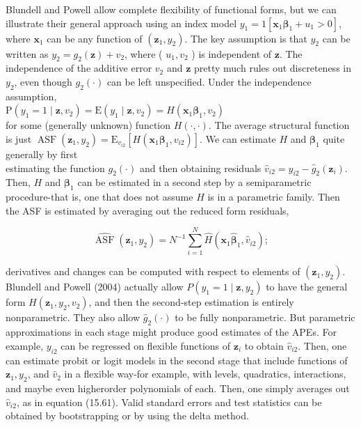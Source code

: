 \documentclass[10pt]{article}
\begin{document}
Blundell and Powell allow complete flexibility of functional forms, but we can illustrate their general approach using an index model $y_{1}=1\left[\mathbf{x}_{1} \boldsymbol{\beta}_{1}+u_{1}>0\right]$, where $\mathbf{x}_{1}$ can be any function of $\left(\mathbf{z}_{1}, y_{2}\right)$. The key assumption is that $y_{2}$ can be written as $y_{2}=g_{2}(\mathbf{z})+v_{2}$, where ( $u_{1}, v_{2}$ ) is independent of $\mathbf{z}$. The independence of the additive error $v_{2}$ and $\mathbf{z}$ pretty much rules out discreteness in $y_{2}$, even though $g_{2}(\cdot)$ can be left unspecified. Under the independence assumption,\\
$\mathrm{P}\left(y_{1}=1 \mid \mathbf{z}, v_{2}\right)=\mathrm{E}\left(y_{1} \mid \mathbf{z}, v_{2}\right)=H\left(\mathbf{x}_{1} \boldsymbol{\beta}_{1}, v_{2}\right)$\\
for some (generally unknown) function $H(\cdot, \cdot)$. The average structural function is just $\operatorname{ASF}\left(\mathbf{z}_{1}, y_{2}\right)=\mathrm{E}_{v_{i 2}}\left[H\left(\mathbf{x}_{1} \boldsymbol{\beta}_{1}, v_{i 2}\right)\right]$. We can estimate $H$ and $\boldsymbol{\beta}_{1}$ quite generally by first\\
estimating the function $g_{2}(\cdot)$ and then obtaining residuals $\hat{v}_{i 2}=y_{i 2}-\hat{g}_{2}\left(\mathbf{z}_{i}\right)$. Then, $H$ and $\boldsymbol{\beta}_{1}$ can be estimated in a second step by a semiparametric procedure-that is, one that does not assume $H$ is in a parametric family. Then the ASF is estimated by averaging out the reduced form residuals,


\begin{equation*}
\widehat{\operatorname{ASF}}\left(\mathbf{z}_{1}, y_{2}\right)=N^{-1} \sum_{i=1}^{N} \hat{H}\left(\mathbf{x}_{1} \hat{\boldsymbol{\beta}}_{1}, \hat{v}_{i 2}\right) ; \tag{15.61}
\end{equation*}


derivatives and changes can be computed with respect to elements of $\left(\mathbf{z}_{1}, y_{2}\right)$.\\
Blundell and Powell (2004) actually allow $P\left(y_{1}=1 \mid \mathbf{z}, y_{2}\right)$ to have the general form $H\left(\mathbf{z}_{1}, y_{2}, v_{2}\right)$, and then the second-step estimation is entirely nonparametric. They also allow $\hat{g}_{2}(\cdot)$ to be fully nonparametric. But parametric approximations in each stage might produce good estimates of the APEs. For example, $y_{i 2}$ can be regressed on flexible functions of $\mathbf{z}_{i}$ to obtain $\hat{v}_{i 2}$. Then, one can estimate probit or logit models in the second stage that include functions of $\mathbf{z}_{1}, y_{2}$, and $\hat{v}_{2}$ in a flexible way-for example, with levels, quadratics, interactions, and maybe even higherorder polynomials of each. Then, one simply averages out $\hat{v}_{i 2}$, as in equation (15.61). Valid standard errors and test statistics can be obtained by bootstrapping or by using the delta method.
\end{document}
